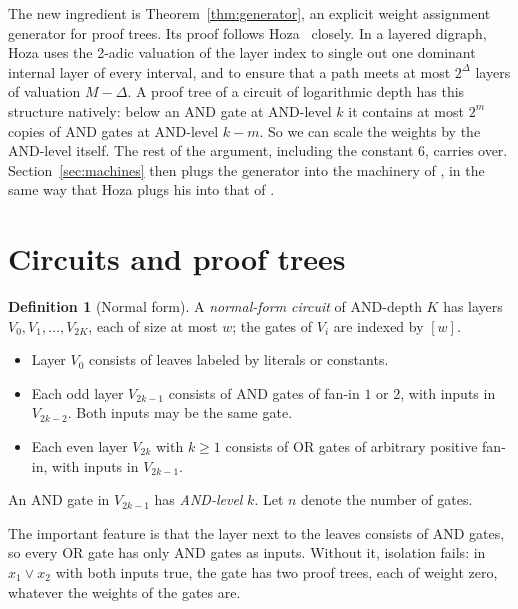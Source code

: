 \documentclass[11pt,letterpaper]{article}
\theoremstyle{definition}
\newtheorem{definition}[theorem]{Definition}
\theoremstyle{remark}
\begin{document}
The new ingredient is Theorem~\ref{thm:generator}, an explicit
weight assignment generator for proof trees. Its proof follows
Hoza~\cite[\S2]{Hoza} closely. In a layered digraph, Hoza uses the
2-adic valuation of the layer index to single out one dominant internal
layer of every interval, and to ensure that a path meets at most $2^\Delta$ layers of
valuation $M-\Delta$. A proof tree of a circuit of logarithmic depth has
this structure natively: below an AND gate at AND-level $k$ it contains at
most $2^m$ copies of AND gates at AND-level $k-m$. So we can scale the
weights by the AND-level itself. The rest of the argument, including the
constant $6$, carries over. Section~\ref{sec:machines} then plugs the
generator into the machinery of \cite{vMP}, in the same way that Hoza plugs
his into that of \cite{RA}.

\section{Circuits and proof trees}

\begin{definition}[Normal form]\label{def:normal}
A \emph{normal-form circuit} of AND-depth $K$ has layers $V_0,V_1,\dots,V_{2K}$, each
of size at most $w$; the gates of $V_i$ are indexed by $[w]$.
\begin{itemize}
\item Layer $V_0$ consists of leaves labeled by literals or constants.
\item Each odd layer $V_{2k-1}$ consists of AND gates of fan-in $1$ or $2$, with
 inputs in $V_{2k-2}$. Both inputs may be the same gate.
\item Each even layer $V_{2k}$ with $k\ge 1$ consists of OR gates of arbitrary
 positive fan-in, with inputs in $V_{2k-1}$.
\end{itemize}
An AND gate in $V_{2k-1}$ has \emph{AND-level} $k$. Let $n$ denote the
number of gates.
\end{definition}

The important feature is that the layer next to the leaves consists of AND
gates, so every OR gate has only AND gates as inputs. Without it,
isolation fails: in $x_1\vee x_2$ with both inputs true, the gate has two proof
trees, each of weight zero, whatever the weights of the gates are.
\end{document}
